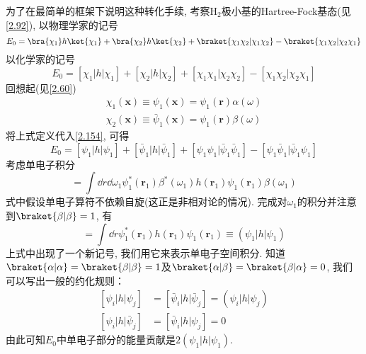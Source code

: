 为了在最简单的框架下说明这种转化手续, 
考察$\mathrm{H}_2$极小基的Hartree-Fock基态(见\autoref{2.92}), 
以物理学家的记号
\begin{equation}
E_0 = \bra{\chi_1}h\ket{\chi_1} + \bra{\chi_2}h\ket{\chi_2} + \braket{\chi_1\chi_2|\chi_1\chi_2} - \braket{\chi_1\chi_2|\chi_2\chi_1}
\end{equation}
以化学家的记号
\begin{equation}
\label{2.154}
E_0 = [{\chi_1|h|\chi_1}] + [{\chi_2|h|\chi_2}] + [{\chi_1\chi_1|\chi_2\chi_2}] - [{\chi_1\chi_2|\chi_2\chi_1}]
\end{equation}
回想起(见\autoref{2.60})
\begin{align}
\chi_1(\mathbf{x})\equiv \psi_1(\mathbf{x}) = \psi_1(\mathbf{\mathbf{r}})\alpha(\omega)\\
\chi_2(\mathbf{x})\equiv \bar{\psi}_1(\mathbf{x}) = \psi_1(\mathbf{\mathbf{r}})\beta(\omega)
\end{align}
将上式定义代入\autoref{2.154}, 
可得
\begin{equation}
\label{2.157}
E_0 = [{\psi_1|h|\psi_1}] + [{\bar{\psi}_1|h|\bar{\psi}_1}] + [{\psi_1\psi_1|\bar{\psi}_1\bar{\psi}_1}] - [{\psi_1\bar{\psi}_1|\bar{\psi}_1\psi_1}]
\end{equation}
考虑单电子积分
\begin{equation}
[\bar{\psi}_1|h|\bar{\psi}_1] = \int\dd{r}\dd\omega_1\psi_1^*(\mathbf{r}_1)\beta^*(\omega_1)h(\mathbf{r}_1)\psi_1(\mathbf{r}_1)\beta(\omega_1)
\end{equation}
式中假设单电子算符不依赖自旋(这正是非相对论\ha 的情况). 
完成对$\omega_1$的积分并注意到$\braket{\beta|\beta}=1$, 
有
\begin{equation}
[\bar{\psi}_1|h|\bar{\psi}_1] =\int\dd{r}\psi_1^*(\mathbf{r}_1)h(\mathbf{r}_1)\psi_1(\mathbf{r}_1) \equiv (\psi_1|h|\psi_1)
\end{equation}
上式中出现了一个新记号, 
我们用它来表示单电子空间积分. 
知道$\braket{\alpha|\alpha}=\braket{\beta|\beta}=1$及$\braket{\alpha|\beta}=\braket{\beta|\alpha}=0$, 
我们可以写出一般的约化规则：
\begin{align}
\label{2.160}
[{\psi}_i|h|{\psi}_j] & = [\bar{\psi}_i|h|\bar{\psi}_j] = (\psi_i|h|\psi_j)\\
[{\psi}_i|h|\bar{\psi}_j] & = [\bar{\psi}_i|h|\psi_j] = 0 
\label{2.161}
\end{align}
由此可知$E_0$中单电子部分的能量贡献是$2(\psi_1|h|\psi_1)$.



